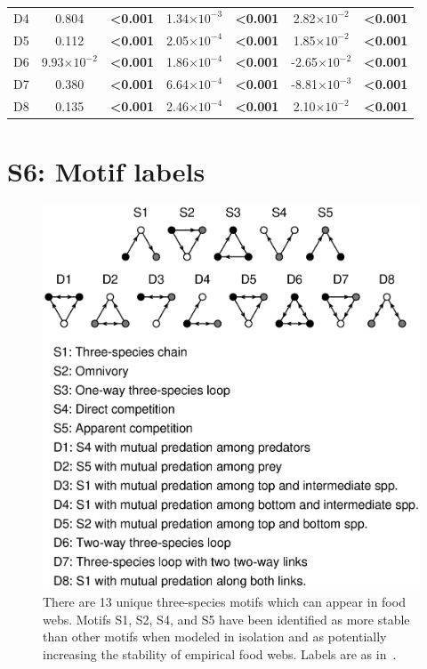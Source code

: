 \documentclass[12pt]{article}
\begin{document}
\begin{table}[h!]
\begin{tabular}{l | c c c c c c }
        D4	&	0.804	&	\textbf{\textless0.001}	&	1.34$\times10^{-3}$	&	\textbf{\textless0.001}	&	2.82$\times10^{-2}$	&	\textbf{\textless0.001}	\\
        D5	&	0.112	&	\textbf{\textless0.001}	&	2.05$\times10^{-4}$	&	\textbf{\textless0.001}	&	1.85$\times10^{-2}$	&	\textbf{\textless0.001}	\\
        D6	&	9.93$\times10^{-2}$	&	\textbf{\textless0.001}	&	1.86$\times10^{-4}$	&	\textbf{\textless0.001}	&	-2.65$\times10^{-2}$	&	\textbf{\textless0.001}	\\
        D7	&	0.380	&	\textbf{\textless0.001}	&	6.64$\times10^{-4}$	&	\textbf{\textless0.001}	&	-8.81$\times10^{-3}$	&	\textbf{\textless0.001}	\\
        D8	&	0.135	&	\textbf{\textless0.001}	&	2.46$\times10^{-4}$	&	\textbf{\textless0.001}	&	2.10$\times10^{-2}$	&	\textbf{\textless0.001}	\\
        \hline
        \end{tabular}
        \end{table}
        

\clearpage

\section*{S6: Motif labels}

	\begin{figure}[h!]
		\caption{There are 13 unique three-species motifs which can appear in food webs. Motifs S1, S2, S4, and S5 have been identified as more stable than other motifs when modeled in isolation and as potentially increasing the stability of empirical food webs. Labels are as in~\citet{Stouffer2007}.}
		\label{motifs}
		\includegraphics[width=.8\textwidth]{figures/motifs.eps}
		\end{figure}


\clearpage

     
\end{document}

